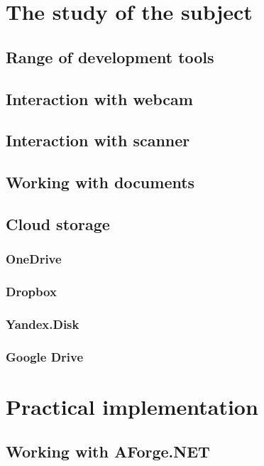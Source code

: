 \documentclass[12pt,journal,compsoc]{D:/Магистратура/English/bare_conf/IEEEtran}
\begin{document}
\section{The study of the subject}

\subsection{Range of development tools}

\subsection{Interaction with webcam}

\subsection{Interaction with scanner}

\subsection{Working with documents}

\subsection{Cloud storage}

\subsubsection{OneDrive}

\subsubsection{Dropbox}

\subsubsection{Yandex.Disk}

\subsubsection{Google Drive}

\section{Practical implementation}

\subsection{Working with AForge.NET}
\end{document}
